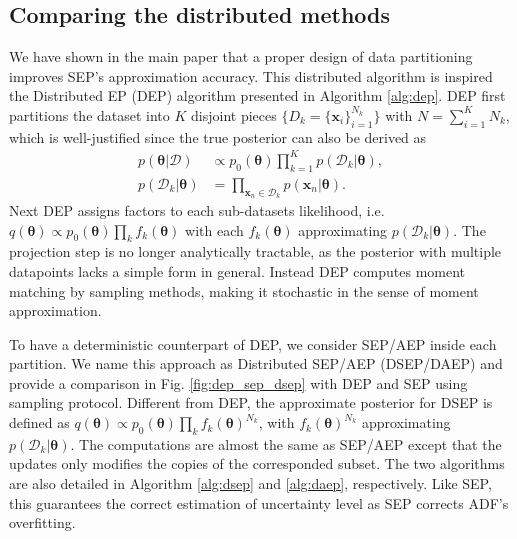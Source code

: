 \documentclass{article} %
\begin{document}
\subsection{Comparing the distributed methods}
We have shown in the main paper that a proper design of data partitioning improves SEP's approximation accuracy. This distributed algorithm is inspired the Distributed EP (DEP) algorithm \cite{gelman:dep}\cite{xu:sms} presented in Algorithm \ref{alg:dep}. DEP first partitions the dataset into $K$ disjoint pieces $\{ D_k = \{\bm{x}_i\}_{i=1}^{N_k} \}$ with $N = \sum_{i=1}^K N_k$, which is well-justified since the true posterior can also be derived as
\begin{align}
p(\bm{\theta}|\mathcal{D}) &\propto p_0(\bm{\theta}) \prod_{k=1}^K p(\mathcal{D}_k|\bm{\theta}), \\
p(\mathcal{D}_k|\bm{\theta}) &= \prod_{\bm{x}_n \in \mathcal{D}_k} p(\bm{x}_n | \bm{\theta}).
\end{align}
%
Next DEP assigns factors to each sub-datasets likelihood, i.e.~$q(\bm{\theta}) \propto p_0(\bm{\theta}) \prod_k f_k(\bm{\theta})$ with each $f_k(\bm{\theta})$ approximating $p(\mathcal{D}_k|\bm{\theta})$. The projection step is no longer analytically tractable, as the posterior with multiple datapoints lacks a simple form in general. Instead DEP computes moment matching by sampling methods, making it stochastic in the sense of moment approximation. 

%
To have a deterministic counterpart of DEP, we consider SEP/AEP inside each partition. We name this approach as Distributed SEP/AEP (DSEP/DAEP) and provide a comparison in Fig. \ref{fig:dep_sep_dsep} with DEP and SEP using sampling protocol. Different from DEP, the approximate posterior for DSEP is defined as $q(\bm{\theta}) \propto p_0(\bm{\theta}) \prod_k f_k(\bm{\theta})^{N_k}$, with $f_k(\bm{\theta})^{N_k}$ approximating $p(\mathcal{D}_k|\bm{\theta})$. The computations are almost the same as SEP/AEP except that the updates only modifies the copies of the corresponded subset.
%
The two algorithms are also detailed in Algorithm \ref{alg:dsep} and \ref{alg:daep}, respectively. Like SEP, this guarantees the correct estimation of uncertainty level as SEP corrects ADF's overfitting. 
\end{document}
